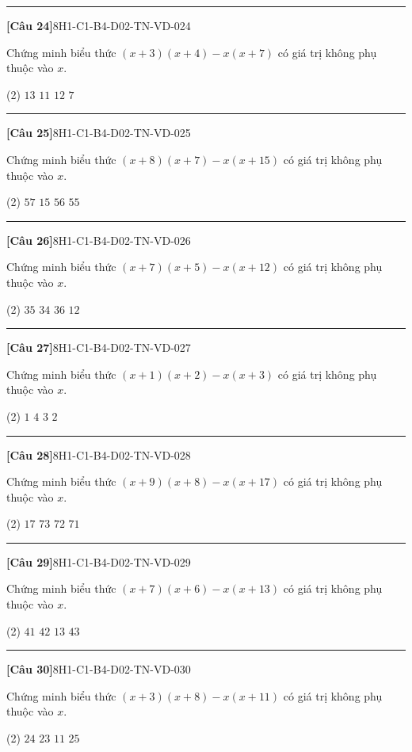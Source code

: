 \documentclass[12pt,a4paper]{article}
\newif\ifloigiai
\newenvironment{cauhoi}[2]{%
  \par\medskip\noindent\rule{\textwidth}{0.4pt}\par\nopagebreak
  \noindent\textbf{[#1]}\hfill{\scriptsize\ttfamily #2}\par\nopagebreak\smallskip}{\par}
\newcommand{\dapan}[1]{\ifloigiai\par\smallskip\noindent\textit{Đáp án:} \textbf{#1}\par\fi}
\begin{document}
\begin{cauhoi}{Câu 24}{8H1-C1-B4-D02-TN-VD-024}
Chứng minh biểu thức $(x+3)(x+4)-x(x+7)$ có giá trị không phụ thuộc vào $x$.
\begin{tasks}(2)
\task $13$
\task $11$
\task $12$
\task $7$
\end{tasks}
\dapan{C}
\end{cauhoi}
\begin{cauhoi}{Câu 25}{8H1-C1-B4-D02-TN-VD-025}
Chứng minh biểu thức $(x+8)(x+7)-x(x+15)$ có giá trị không phụ thuộc vào $x$.
\begin{tasks}(2)
\task $57$
\task $15$
\task $56$
\task $55$
\end{tasks}
\dapan{C}
\end{cauhoi}
\begin{cauhoi}{Câu 26}{8H1-C1-B4-D02-TN-VD-026}
Chứng minh biểu thức $(x+7)(x+5)-x(x+12)$ có giá trị không phụ thuộc vào $x$.
\begin{tasks}(2)
\task $35$
\task $34$
\task $36$
\task $12$
\end{tasks}
\dapan{A}
\end{cauhoi}
\begin{cauhoi}{Câu 27}{8H1-C1-B4-D02-TN-VD-027}
Chứng minh biểu thức $(x+1)(x+2)-x(x+3)$ có giá trị không phụ thuộc vào $x$.
\begin{tasks}(2)
\task $1$
\task $4$
\task $3$
\task $2$
\end{tasks}
\dapan{D}
\end{cauhoi}
\begin{cauhoi}{Câu 28}{8H1-C1-B4-D02-TN-VD-028}
Chứng minh biểu thức $(x+9)(x+8)-x(x+17)$ có giá trị không phụ thuộc vào $x$.
\begin{tasks}(2)
\task $17$
\task $73$
\task $72$
\task $71$
\end{tasks}
\dapan{C}
\end{cauhoi}
\begin{cauhoi}{Câu 29}{8H1-C1-B4-D02-TN-VD-029}
Chứng minh biểu thức $(x+7)(x+6)-x(x+13)$ có giá trị không phụ thuộc vào $x$.
\begin{tasks}(2)
\task $41$
\task $42$
\task $13$
\task $43$
\end{tasks}
\dapan{B}
\end{cauhoi}
\begin{cauhoi}{Câu 30}{8H1-C1-B4-D02-TN-VD-030}
Chứng minh biểu thức $(x+3)(x+8)-x(x+11)$ có giá trị không phụ thuộc vào $x$.
\begin{tasks}(2)
\task $24$
\task $23$
\task $11$
\task $25$
\end{tasks}
\dapan{A}
\end{cauhoi}
\end{document}
